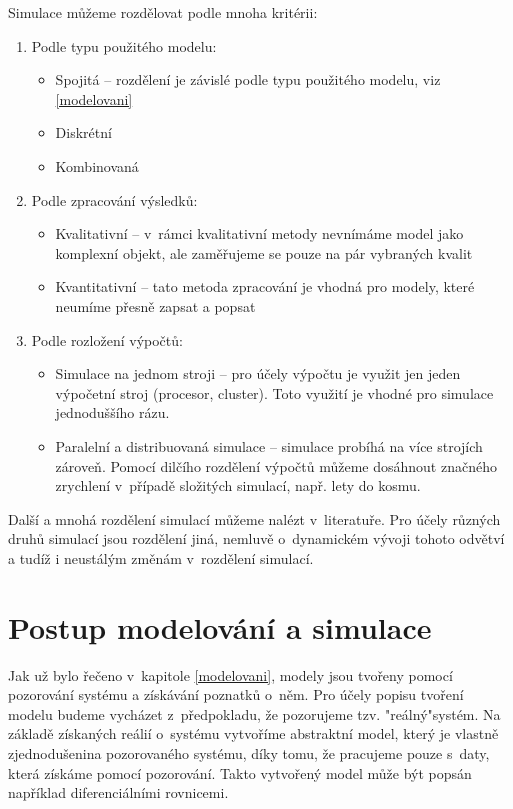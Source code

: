 Simulace můžeme rozdělovat podle mnoha kritérii:
\begin{enumerate}
    \item Podle typu použitého modelu:
        \begin{itemize}
            \item Spojitá -- rozdělení je závislé podle typu použitého modelu, viz \ref{modelovani}
            \item Diskrétní
            \item Kombinovaná
        \end{itemize}
    \item Podle zpracování výsledků:
        \begin{itemize}
            \item Kvalitativní -- v~rámci kvalitativní metody nevnímáme model jako komplexní objekt, ale zaměřujeme se pouze na pár vybraných kvalit
            \item Kvantitativní -- tato metoda zpracování je vhodná pro modely, které neumíme přesně zapsat a popsat
        \end{itemize}
    \item Podle rozložení výpočtů:
        \begin{itemize}
            \item Simulace na jednom stroji -- pro účely výpočtu je využit jen jeden výpočetní stroj (procesor, cluster). Toto využití je vhodné pro simulace jednoduššího rázu.
            \item Paralelní a distribuovaná simulace -- simulace probíhá na více strojích zároveň. Pomocí dilčího rozdělení výpočtů můžeme dosáhnout značného zrychlení v~případě složitých simulací, např. lety do kosmu.
        \end{itemize}
\end{enumerate}
Další a mnohá rozdělení simulací můžeme nalézt v~literatuře. Pro účely různých druhů simulací jsou rozdělení jiná, nemluvě o~dynamickém vývoji tohoto odvětví a tudíž i neustálým změnám v~rozdělení simulací.

\section{Postup modelování a simulace}
Jak už bylo řečeno v~kapitole \ref{modelovani}, modely jsou tvořeny pomocí pozorování systému a získávání poznatků o~něm. Pro účely popisu tvoření modelu budeme vycházet z~předpokladu, že pozorujeme tzv. "reálný"\space systém. Na základě získaných reálií o~systému vytvoříme abstraktní model, který je vlastně zjednodušenina pozorovaného systému, díky tomu, že pracujeme pouze s~daty, která získáme pomocí pozorování. Takto vytvořený model může být popsán například diferenciálními rovnicemi.

